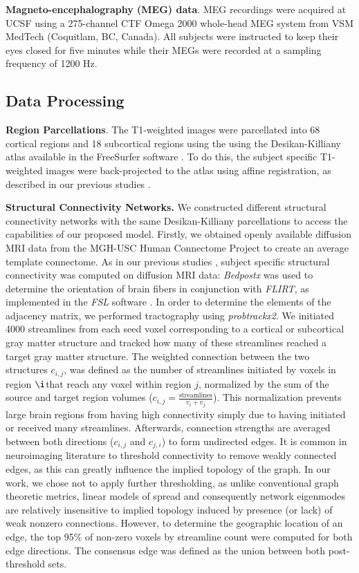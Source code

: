 \textbf{Magneto-encephalography (MEG) data}. MEG recordings were
acquired at UCSF using a 275-channel CTF Omega 2000 whole-head MEG
system from VSM MedTech (Coquitlam, BC, Canada). All subjects were
instructed to keep their eyes closed for five minutes while their MEGs
were recorded at a sampling frequency of 1200 Hz.

\subsection{Data Processing}

\textbf{Region Parcellations}. The T1-weighted images were parcellated
into 68 cortical regions and 18 subcortical regions using the using the
Desikan-Killiany atlas available in the FreeSurfer software
\cite{Fischl2002}. To do this, the subject specific T1-weighted
images were back-projected to the atlas using affine registration, as
described in our previous studies \cite{abdelnour_network_2014,owen_structural_2013}.

\textbf{Structural Connectivity Networks.} We constructed different
structural connectivity networks with the same Desikan-Killiany
parcellations to access the capabilities of our proposed model. Firstly,
we obtained openly available diffusion MRI data from the MGH-USC Human
Connectome Project to create an average template connectome. As in our
previous studies \cite{abdelnour_network_2014,owen_structural_2013}, subject specific structural
connectivity was computed on diffusion MRI data: \emph{Bedpostx} was
used to determine the orientation of brain fibers in conjunction with
\emph{FLIRT}, as implemented in the \emph{FSL} software
\cite{Jenkinson2012}. In order to determine the elements of the
adjacency matrix, we performed tractography using \emph{probtrackx2}. We
initiated 4000 streamlines from each seed voxel corresponding to a
cortical or subcortical gray matter structure and tracked how many of
these streamlines reached a target gray matter structure. The weighted
connection between the two structures $c_{i,j}$, was defined as the
number of streamlines initiated by voxels in region $\i$that
reach any voxel within region $j$, normalized by the sum of the source
and target region volumes
($c_{i,j} = \frac{\textrm{streamlines}}{v_{i} + v_{j}}$). This
normalization prevents large brain regions from having high connectivity
simply due to having initiated or received many streamlines. Afterwards,
connection strengths are averaged between both directions ($c_{i,j}$
and $c_{j,i}$) to form undirected edges. It is common in neuroimaging
literature to threshold connectivity to remove weakly connected edges,
as this can greatly influence the implied topology of the graph. In our
work, we chose not to apply further thresholding, as unlike conventional
graph theoretic metrics, linear models of spread and consequently
network eigenmodes are relatively insensitive to implied topology
induced by presence (or lack) of weak nonzero connections. However, to
determine the geographic location of an edge, the top 95\% of non-zero
voxels by streamline count were computed for both edge directions. The
consensus edge was defined as the union between both post-threshold
sets.

